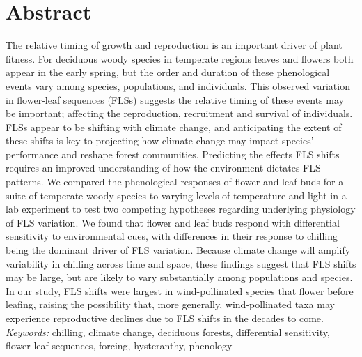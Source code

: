 \documentclass[11pt]{article}\usepackage[]{graphicx}\usepackage[]{color}
\begin{document}
\section*{Abstract}  
The relative timing of growth and reproduction is an important driver of plant fitness. For deciduous woody species in temperate regions leaves and flowers both appear in the early spring, but the order and duration of these phenological events vary among species, populations, and individuals. This observed variation in flower-leaf sequences (FLSs) suggests the relative timing of these events may be important; affecting the reproduction, recruitment and survival of individuals. FLSs appear to be shifting with climate change, and anticipating the extent of these shifts is key to projecting how climate change may impact species' performance and reshape forest communities. Predicting the effects FLS shifts requires an improved understanding of how the environment dictates FLS patterns. We compared the phenological responses of flower and leaf buds for a suite of temperate woody species to varying levels of temperature and light in a lab experiment to test two competing hypotheses regarding underlying physiology of FLS variation. We found that flower and leaf buds respond with differential sensitivity to environmental cues, with differences in their response to chilling being the dominant driver of FLS variation. Because climate change will amplify variability in chilling across time and space, these findings suggest that FLS shifts may be large, but are likely to vary substantially among populations and species. In our study, FLS shifts were largest in wind-pollinated species that flower before leafing, raising the possibility that, more generally, wind-pollinated taxa may experience reproductive declines due to FLS shifts in the decades to come.   \\ %

\noindent \emph{Keywords:} chilling, climate change, deciduous forests, differential sensitivity, flower-leaf sequences, forcing, hysteranthy, phenology  \\ 
\end{document}
